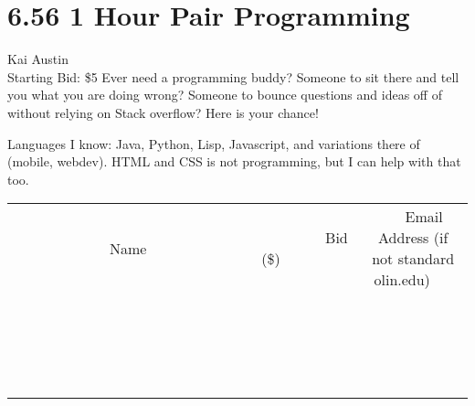 \documentclass[11pt]{article}
\begin{document}
\section*{6.56 1 Hour Pair Programming}
Kai Austin
\\
Starting Bid: \$5
\newline
Ever need a programming buddy? Someone to sit there and tell you what you are doing wrong? Someone to bounce questions and ideas off of without relying on Stack overflow? Here is your chance!

Languages I know: Java, Python, Lisp, Javascript, and variations there of (mobile, webdev). HTML and CSS is not programming, but I can help with that too.
\\[3ex]
\begin{tabular}{c c c}
~~~~~~~~~~~~~Name~~~~~~~~~~~~~ & ~~~~~~~~~Bid (\$)~~~~~~~~~  & ~~~Email Address (if not standard olin.edu)~~~\\
 & & \\
\hline
 & & \\
\hline
 & & \\
\hline
 & & \\
\hline
 & & \\
\hline
 & & \\
\hline
 & & \\
\hline
 & & \\
\hline
 & & \\
\hline
 & & \\
\hline
 & & \\
\hline
 & & \\
\hline
 & & \\
\hline
 & & \\
\hline
 & & \\
\hline
 & & \\
\hline
 & & \\
\hline
 & & \\
\hline
 & & \\
\hline
\end{tabular}
\newpage
\end{document}
